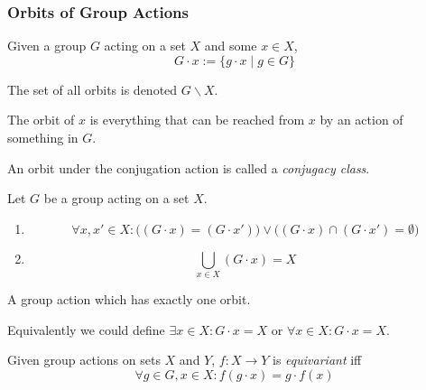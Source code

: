 \subsubsection{Orbits of Group Actions}
\begin{definition}[Orbit]
   Given a group \(G\) acting on a set \(X\) and some \(x \in X\),
   \[G \cdot x := \{g \cdot x \mid g \in G\}\]
\end{definition}
\begin{remark}[Notation]
   The set of all orbits is denoted \(G\backslash X\).
\end{remark}
\begin{remark}[Intuition]
   The orbit of \(x\) is everything that can be reached from \(x\) by an action of something in \(G\).
\end{remark}
\begin{remark}
   An orbit under the conjugation action is called a \emph{conjugacy class}.
\end{remark}

\begin{proposition}
   Let \(G\) be a group acting on a set \(X\).
   \begin{enumerate}[label=\roman*, align=Center]
      \item \[\forall x, x' \in X: \big((G \cdot x) = (G \cdot x')\big) \lor \big((G \cdot x) \cap (G \cdot x') = \emptyset\big)\]
      \item \[\bigcup_{x \in X} (G \cdot x) = X\]
   \end{enumerate}
\end{proposition}

\begin{definition}
   A group action which has exactly one orbit.
\end{definition}
\begin{remark}
   Equivalently we could define \(\exists x \in X: G \cdot x = X\) or \(\forall x \in X: G \cdot x = X\).
\end{remark}

\begin{definition}
   Given group actions on sets \(X\) and \(Y\), \(f: X \to Y\) is \emph{equivariant} iff
   \[\forall g \in G, x \in X: f(g \cdot x) = g \cdot f(x)\]
\end{definition}

